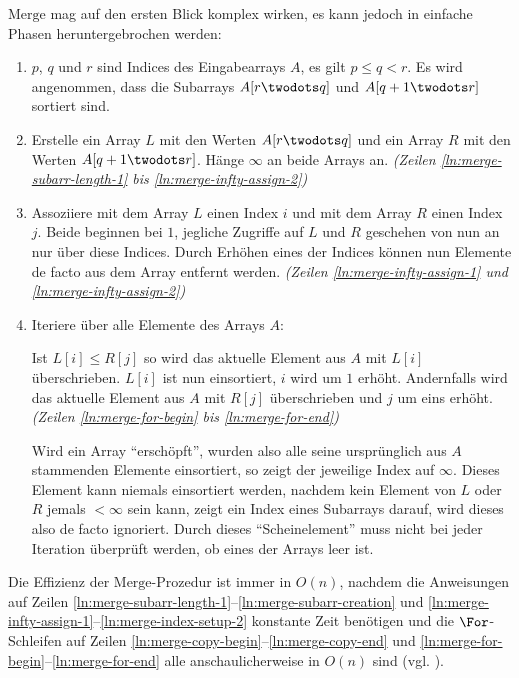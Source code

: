 $\text{Merge}$ mag auf den ersten Blick komplex wirken, es kann jedoch in einfache Phasen heruntergebrochen werden:
\begin{enumerate}[start=0]
    \item $p$, $q$ und $r$ sind Indices des Eingabearrays $A$, es gilt $p \leq q < r$. Es wird angenommen, dass die Subarrays $A[r \twodots q]$ und $A[q + 1 \twodots r]$ sortiert sind.

    \item Erstelle ein Array $L$ mit den Werten $A[r \twodots q]$ und ein Array $R$ mit den Werten $A[q + 1 \twodots r]$. Hänge $\infty$ an beide Arrays an. \emph{(Zeilen \ref{ln:merge-subarr-length-1} bis \ref{ln:merge-infty-assign-2})}

    \item Assoziiere mit dem Array $L$ einen Index $i$ und mit dem Array $R$ einen Index $j$. Beide beginnen bei $1$, jegliche Zugriffe auf $L$ und $R$ geschehen von nun an nur über diese Indices. Durch Erhöhen eines der Indices können nun Elemente de facto aus dem Array entfernt werden. \emph{(Zeilen \ref{ln:merge-infty-assign-1} und \ref{ln:merge-infty-assign-2})}

    \item Iteriere über alle Elemente des Arrays $A$:

    Ist $L[i] \leq R[j]$ so wird das aktuelle Element aus $A$ mit $L[i]$ überschrieben. $L[i]$ ist nun einsortiert, $i$ wird um $1$ erhöht. Andernfalls wird das aktuelle Element aus $A$ mit $R[j]$ überschrieben und $j$ um eins erhöht. \emph{(Zeilen \ref{ln:merge-for-begin} bis \ref{ln:merge-for-end})}

    Wird ein Array \enquote{erschöpft}, wurden also alle seine ursprünglich aus $A$ stammenden Elemente einsortiert, so zeigt der jeweilige Index auf $\infty$. Dieses Element kann niemals einsortiert werden, nachdem kein Element von $L$ oder $R$ jemals $< \infty$ sein kann, zeigt ein Index eines Subarrays darauf, wird dieses also de facto ignoriert. Durch dieses \enquote{Scheinelement} muss nicht bei jeder Iteration überprüft werden, ob eines der Arrays leer ist.
\end{enumerate}

Die Effizienz der $\text{Merge}$-Prozedur ist immer in $O(n)$, nachdem die Anweisungen auf Zeilen \ref{ln:merge-subarr-length-1}--\ref{ln:merge-subarr-creation} und \ref{ln:merge-infty-assign-1}--\ref{ln:merge-index-setup-2} konstante Zeit benötigen und die $\For$-Schleifen auf Zeilen \ref{ln:merge-copy-begin}--\ref{ln:merge-copy-end} und \ref{ln:merge-for-begin}--\ref{ln:merge-for-end} alle anschaulicherweise in $O(n)$ sind (vgl. \cite[34]{clrs2001}).

